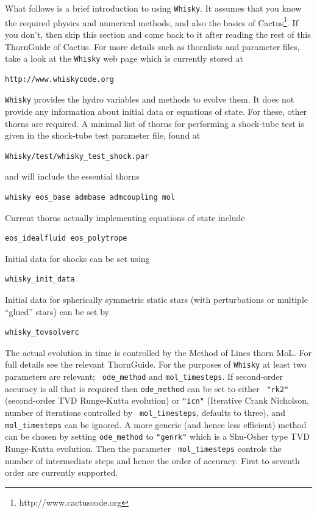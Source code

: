 \documentclass{article}
\begin{document}
What follows is a brief introduction to using {\tt Whisky}. It assumes that
you know the required physics and numerical methods, and also the
basics of Cactus\footnote{http://www.cactuscode.org}. If you don't, then skip this section and come back
to it after reading the rest of this ThornGuide of Cactus. For more details such
as thornlists and parameter files, take a look at the {\tt Whisky} web page
which is currently stored at
\begin{verbatim}
http://www.whiskycode.org
\end{verbatim}

{\tt Whisky} provides the hydro variables and methods to evolve them. It
does not provide any information about initial data or equations of
state. For these, other thorns are required. A minimal list of thorns
for performing a shock-tube test is given in the shock-tube test
parameter file, found at
\begin{verbatim}
Whisky/test/whisky_test_shock.par
\end{verbatim}
and will include the essential thorns
\begin{verbatim}
whisky eos_base admbase admcoupling mol
\end{verbatim}
Current thorns actually implementing equations of state include
\begin{verbatim}
eos_idealfluid eos_polytrope
\end{verbatim}
Initial data for shocks can be set using
\begin{verbatim}
whisky_init_data 
\end{verbatim}
Initial data for spherically symmetric static stars (with
perturbations or multiple ``glued'' stars) can be set by
\begin{verbatim}
whisky_tovsolverc
\end{verbatim}

The actual evolution in time is controlled by the Method of Lines
thorn MoL. For full details see the relevant ThornGuide. For the
purposes of {\tt Whisky} at least two parameters are relevant; {\tt
  ode\_method} and {\tt mol\_timesteps}. If second-order accuracy is
all that is required then {\tt ode\_method} can be set to either {\tt
  "rk2"} (second-order TVD Runge-Kutta evolution) or {\tt "icn"}
(Iterative Crank Nicholson, number of iterations controlled by {\tt
  mol\_timesteps}, defaults to three), and {\tt mol\_timesteps} can be
ignored. A more generic (and hence less efficient) method can be
chosen by setting {\tt ode\_method} to {\tt "genrk"} which is a
Shu-Osher type TVD Runge-Kutta evolution. Then the parameter {\tt
  mol\_timesteps} controls the number of intermediate steps and hence
the order of accuracy. First to seventh order are currently supported.
\end{document}
